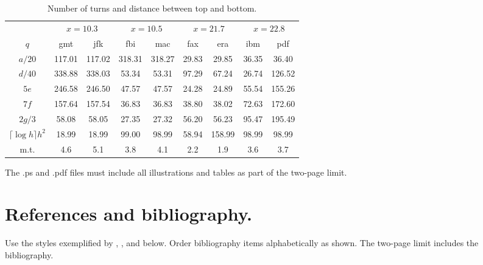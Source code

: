 \documentclass[twoside]{article}
\begin{document}
\begin{table}[h]
\begin{center} {\footnotesize
\begin{tabular}{|c|cc|cc|cc|cc|}
\hline
 & \multicolumn{2}{c|}{$x=10.3$} & \multicolumn{2}{c|}{$x=10.5$} &
\multicolumn{2}{c|}{$x=21.7$} & \multicolumn{2}{c|}{$x=22.8$} \\
$q$  & \multicolumn{1}{c}{gmt} & \multicolumn{1}{c|}{jfk} &
\multicolumn{1}{c}{fbi} & \multicolumn{1}{c|}{mac} & \multicolumn{1}{c}{fax} &
\multicolumn{1}{c|}{era} & \multicolumn{1}{c}{ibm} &
\multicolumn{1}{c|}{pdf}\\\hline
$a/20$ &     117.01 & 117.02  &   318.31 & 318.27  &   29.83 & 29.85    & 36.35 
& 36.40 \\
$d/40$  &     338.88 & 338.03  &   53.34 & 53.31  &  97.29 & 67.24 &   26.74 &
126.52 \\
$5e$ &     246.58 & 246.50  &   47.57 & 47.57  &  24.28 & 24.89 &   55.54 &
155.26 \\
$7f$    &     157.64 & 157.54  &   36.83 & 36.83  &  38.80 & 38.02 &   72.63 &
172.60 \\
$2g/3$   &     58.08 & 58.05  &   27.35 & 27.32  &  56.20 & 56.23 &   95.47 &
195.49 \\
$\lceil \log h \rceil h^2$    &     18.99 & 18.99  &   99.00 & 98.99  &  58.94 &
158.99 &   98.99 & 98.99 \\
\hline m.t. &     4.6 &  5.1 &     3.8 &  4.1 &     2.2 & 1.9  &   3.6 &  3.7 \\
\hline
\end{tabular} }
\end{center}
\caption{\footnotesize Number of turns and distance between top and bottom.}
\label{turns}
\end{table}

The .ps and .pdf files must include all illustrations and tables as part of the
two-page limit.

\section{\large References and bibliography.}

Use the styles exemplified by \cite{HB98}, \cite{CA}, \cite{MSW00} and
\cite{Rei91} below.  Order bibliography items alphabetically as shown.  The
two-page limit includes the bibliography.
 
\end{document}
